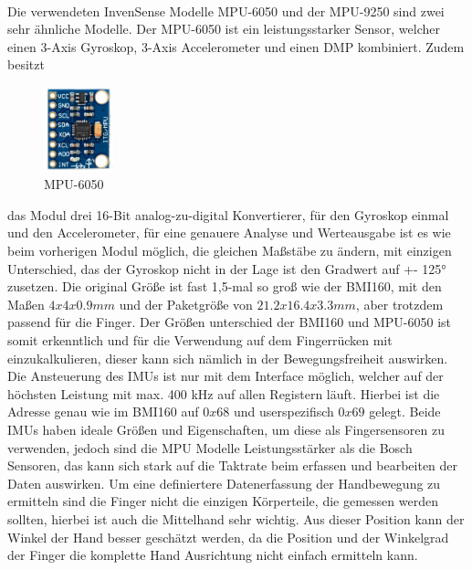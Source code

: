 \\
Die verwendeten InvenSense Modelle MPU-6050 und der MPU-9250 sind zwei sehr ähnliche Modelle. Der MPU-6050 ist ein leistungsstarker Sensor, welcher einen 3-Axis Gyroskop, 3-Axis Accelerometer und einen DMP kombiniert. 
Zudem besitzt 
\setlength\parfillskip{0pt}\par\setlength{}
\begin{figure}
  \begin{center}
    \includegraphics[width=0.18\textwidth]{Bachelorarbeit/images/6050.png}
  \end{center}
  \caption{MPU-6050}
\end{figure}
das Modul drei 16-Bit analog-zu-digital Konvertierer, für den Gyroskop einmal und den Accelerometer, für eine genauere Analyse und Werteausgabe ist es wie beim vorherigen Modul möglich, die gleichen Maßstäbe zu ändern, mit einzigen Unterschied, das der Gyroskop nicht in der Lage ist den Gradwert auf +- 125° zusetzen.
Die original Größe ist fast 1,5-mal so groß wie der BMI160, mit den Maßen  $4 x 4 x 0.9 mm$ und der Paketgröße von $21.2 x 16.4 x 3.3 mm$, aber trotzdem passend für die Finger. 
Der Größen unterschied der BMI160 und MPU-6050 ist somit erkenntlich und für die Verwendung auf dem Fingerrücken mit einzukalkulieren, dieser kann sich nämlich in der Bewegungsfreiheit auswirken. 
Die Ansteuerung des IMUs ist nur mit dem \iic  Interface möglich, welcher auf der höchsten Leistung mit max. 400 kHz auf allen Registern läuft. Hierbei ist die Adresse genau wie im BMI160 auf $0x68$ und userspezifisch $0x69$ gelegt. 
Beide IMUs haben ideale Größen und Eigenschaften, um diese als Fingersensoren zu verwenden, jedoch sind die MPU Modelle Leistungsstärker als die Bosch Sensoren, das kann sich stark auf die Taktrate beim erfassen und bearbeiten der Daten auswirken. Um eine definiertere Datenerfassung der Handbewegung zu ermitteln sind die Finger nicht die einzigen Körperteile, die gemessen werden sollten, hierbei ist auch die Mittelhand sehr wichtig. Aus dieser Position kann der Winkel der Hand besser geschätzt werden, da die Position und der Winkelgrad der Finger die komplette Hand Ausrichtung nicht einfach ermitteln kann.
\setlength\parfillskip{0pt}\par\setlength{}
